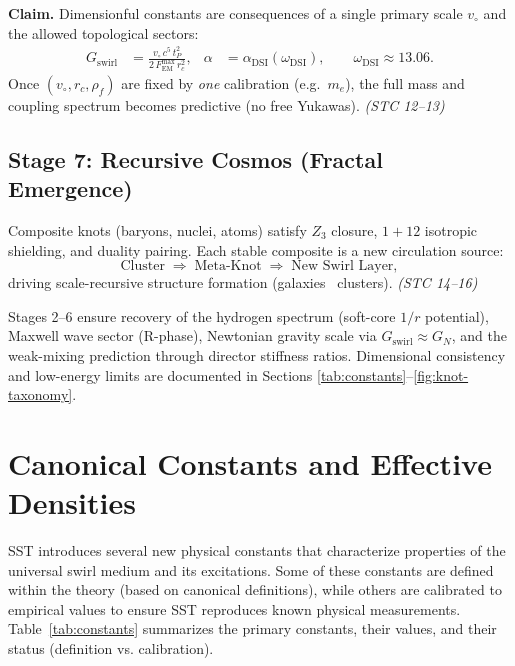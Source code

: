 \documentclass[reprint,aps,onecolumn,nofootinbib]{revtex4-2}
\newcommand{\rhof}{\rho_{\!f}}                           %
\newcommand{\rc}{r_c}                                    %
\newcommand{\FmaxEM}{F_{\mathrm{EM}}^{\max}}             %
\begin{document}
	\begin{tcolorbox}[colback=blue!5!white,colframe=blue!60!black,title=Zero–Parameter Principle (Canonical)]
		\textbf{Claim.} Dimensionful constants are consequences of a single primary scale $v_{\circ}$ and the allowed topological sectors:
		\begin{align}
			G_{\text{swirl}} &= \frac{v_{\circ}\,c^{5}\,t_P^{2}}{2\,\FmaxEM\,\rc^{2}},
			&
			\alpha &= \alpha_{\mathrm{DSI}}\!\left(\omega_{\mathrm{DSI}}\right),
			\qquad \omega_{\mathrm{DSI}}\approx 13.06.
		\end{align}
		Once $(v_{\circ},\rc,\rhof)$ are fixed by \emph{one} calibration (e.g.\ $m_e$),
		the full mass and coupling spectrum becomes predictive (no free Yukawas).
		\emph{(STC 12–13)}
	\end{tcolorbox}

	\subsection*{Stage 7: Recursive Cosmos (Fractal Emergence)}
	Composite knots (baryons, nuclei, atoms) satisfy $Z_3$ closure, $1{+}12$ isotropic shielding, and duality pairing. Each stable composite is a new circulation source:
	\[
		\text{Cluster}\;\Rightarrow\;\text{Meta-Knot}\;\Rightarrow\;\text{New Swirl Layer},
	\]
	driving scale-recursive structure formation (galaxies \textrightarrow\ clusters). \emph{(STC 14–16)}

	\begin{tcolorbox}[title=Traceability Note]
		Stages 2–6 ensure recovery of the hydrogen spectrum (soft-core $1/r$ potential),
		Maxwell wave sector (R-phase), Newtonian gravity scale via $G_{\text{swirl}}\!\approx\!G_N$,
		and the weak-mixing prediction through director stiffness ratios. Dimensional
		consistency and low-energy limits are documented in Sections \ref{tab:constants}–\ref{fig:knot-taxonomy}.
	\end{tcolorbox}


	\section{Canonical Constants and Effective Densities}
	SST introduces several new physical constants that characterize properties of the universal swirl medium and its excitations. Some of these constants are defined within the theory (based on canonical definitions), while others are calibrated to empirical values to ensure SST reproduces known physical measurements. Table~\ref{tab:constants} summarizes the primary constants, their values, and their status (definition vs. calibration).
\end{document}
